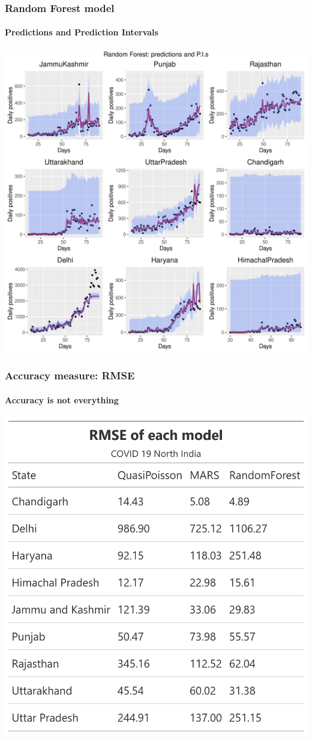 \documentclass{beamer}
\begin{document}
{\begin{frame}
	\end{frame}
	\begin{frame}
		\frametitle{Random Forest model}
		\framesubtitle{Predictions and Prediction Intervals}
		\center \includegraphics[scale = 0.37]{rf_ppi.png}
	\end{frame}
	\begin{frame}
		\frametitle{Accuracy measure: RMSE}
		\framesubtitle{Accuracy is not everything}
		\center \includegraphics[scale = 0.2]{acc_tab.png}
	\end{frame}
}
\end{document}
